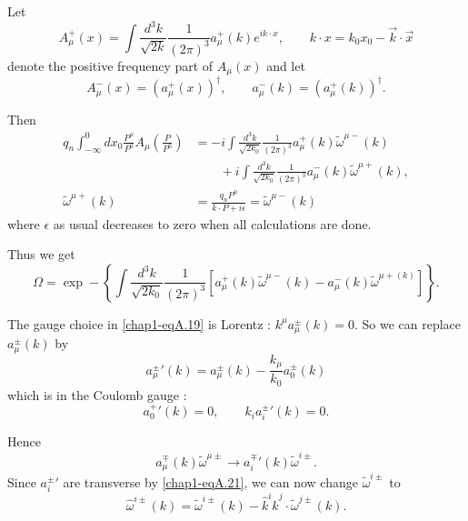 Let
\begin{equation*}
  A_\mu^+ (x) = \int \frac{d^3k}{\sqrt{2k}} \frac{1}{(2\pi)^3}a_\mu^+ (k)e^{ik\cdot x}, \qquad k \cdot x = k_0 x_0- \vec{k} \cdot \vec{x} \label{chap1-eqA.15}\tag{A.15}
\end{equation*}
denote the positive frequency part of $A_\mu(x)$ and let
\begin{equation*}
A_\mu^- (x) = (a_\mu^+ (x))^\dagger, \qquad a_\mu^- (k) = (a_\mu^+ (k))^\dagger. \label{chap1-eqA.16}\tag{A.16}
\end{equation*}

Then
\begin{align*}
  q_n \int^0_{-\infty} dx_0 \frac{P^\mu}{P^0} A_\mu \left( \frac{P}{P^0}\right) & = -i \int \frac{d^3k}{\sqrt{2k_0}} \frac{1}{(2 \pi)^3} a_\mu^+ (k) \tilde{\omega}^{\mu -} (k)\\
  & \qquad + i \int \frac{d^3k}{\sqrt{2k_0}} \frac{1}{(2 \pi)^3} a_\mu^- (k) \tilde{\omega}^{\mu +}(k), \label{chap1-eqA.17}\tag{A.17}\\
  \tilde{\omega}^{\mu +} (k) & = \frac{q_n P^\mu}{k \cdot P + i\epsilon} = {\tilde{\omega}}^{\mu -} (k) \label{chap1-eqA.18}\tag{A.18}
\end{align*}
where $\epsilon$ as usual decreases to zero when all calculations are done.

Thus we get
\begin{equation*}
\Omega = \exp - \left\{ \int \frac{d^3 k}{\sqrt{2k_0}} \frac{1}{(2 \pi)^3} \left[a_\mu^+ (k) \tilde{\omega}^{\mu -} (k) - a_\mu^- (k) \tilde{\omega}^{\mu + (k)} \right]\right\}. \label{chap1-eqA.19}\tag{A.19}
\end{equation*}

The gauge choice in \eqref{chap1-eqA.19} is Lorentz : $k^\mu a_\mu^{\pm} (k) =0$. So we can replace $a_\mu^{\pm} (k)$ by
\begin{equation*}
{a_\mu^{\pm}}' (k) = a_\mu^{\pm} (k) - \frac{k_\mu}{k_0} a_0^\pm (k) \label{chap1-eqA.20}\tag{A.20}
\end{equation*}
which is in the Coulomb gauge :
\begin{equation*}
  {a_0^{+}}' (k) =0, \qquad k_i {a_i^\pm} ' (k) =0. \label{chap1-eqA.21}\tag{A.21}
\end{equation*}

Hence
\begin{equation*}
a_\mu^{\mp} (k) \tilde{\omega}^{\mu \pm} \to {a_i^{\mp}}' (k) \tilde{\omega}^{i \pm}. \label{chap1-eqA.22}\tag{A.22}
\end{equation*}
Since ${a_i^{\pm}}'$ are transverse by \eqref{chap1-eqA.21}, we can now change $\tilde{\omega}^{i \pm }$ to
\begin{equation*}
\hat{\omega}^{i \pm} (k) = \tilde{\omega}^{i \pm} (k) - \hat{k}^{i} \hat{k}^{j} \cdot \tilde{\omega}^{j \pm}(k). \label{chap1-eqA.23}\tag{A.23}
\end{equation*}

